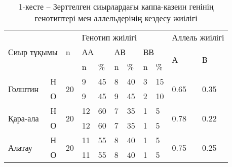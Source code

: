\begin{table}[H]
\centering
  \caption*{1-кесте – Зерттелген сиырлардағы каппа-казеин генінің генотиптері мен аллельдерінің 
  кездесу жиілігі}
  \begin{tabular}{|ll|l|llllll|ll|}
  \hline
  \multicolumn{2}{|l|}{\multirow{3}{*}{Сиыр тұқымы}} &
    \multirow{3}{*}{n} &
    \multicolumn{6}{l|}{Генотип жиілігі} &
    \multicolumn{2}{l|}{Аллель   жиілігі} \\ \cline{4-11} 
  \multicolumn{2}{|l|}{} &
     &
    \multicolumn{2}{l|}{АА} &
    \multicolumn{2}{l|}{АВ} &
    \multicolumn{2}{l|}{ВВ} &
    \multicolumn{1}{l|}{\multirow{2}{*}{А}} &
    \multirow{2}{*}{В} \\ \cline{4-9}
  \multicolumn{2}{|l|}{} &
     &
    \multicolumn{1}{l|}{n} &
    \multicolumn{1}{l|}{\%} &
    \multicolumn{1}{l|}{n} &
    \multicolumn{1}{l|}{\%} &
    \multicolumn{1}{l|}{n} &
    \% &
    \multicolumn{1}{l|}{} &
     \\ \hline
  \multicolumn{1}{|l|}{\multirow{2}{*}{Голштин}} &
    Н &
    \multirow{2}{*}{20} &
    \multicolumn{1}{l|}{9} &
    \multicolumn{1}{l|}{45} &
    \multicolumn{1}{l|}{8} &
    \multicolumn{1}{l|}{40} &
    \multicolumn{1}{l|}{3} &
    15 &
    \multicolumn{1}{l|}{\multirow{2}{*}{0.65}} &
    \multirow{2}{*}{0.35} \\ \cline{2-2} \cline{4-9}
  \multicolumn{1}{|l|}{} &
    О &
     &
    \multicolumn{1}{l|}{9} &
    \multicolumn{1}{l|}{45} &
    \multicolumn{1}{l|}{9} &
    \multicolumn{1}{l|}{45} &
    \multicolumn{1}{l|}{2} &
    10 &
    \multicolumn{1}{l|}{} &
     \\ \hline
  \multicolumn{1}{|l|}{\multirow{2}{*}{Қара-ала}} &
    Н &
    \multirow{2}{*}{20} &
    \multicolumn{1}{l|}{12} &
    \multicolumn{1}{l|}{60} &
    \multicolumn{1}{l|}{7} &
    \multicolumn{1}{l|}{35} &
    \multicolumn{1}{l|}{1} &
    5 &
    \multicolumn{1}{l|}{\multirow{2}{*}{0.78}} &
    \multirow{2}{*}{0.22} \\ \cline{2-2} \cline{4-9}
  \multicolumn{1}{|l|}{} &
    О &
     &
    \multicolumn{1}{l|}{12} &
    \multicolumn{1}{l|}{60} &
    \multicolumn{1}{l|}{7} &
    \multicolumn{1}{l|}{35} &
    \multicolumn{1}{l|}{1} &
    5 &
    \multicolumn{1}{l|}{} &
     \\ \hline
  \multicolumn{1}{|l|}{\multirow{2}{*}{Алатау}} &
    Н &
    \multirow{2}{*}{20} &
    \multicolumn{1}{l|}{11} &
    \multicolumn{1}{l|}{55} &
    \multicolumn{1}{l|}{8} &
    \multicolumn{1}{l|}{40} &
    \multicolumn{1}{l|}{1} &
    5 &
    \multicolumn{1}{l|}{\multirow{2}{*}{0.75}} &
    \multirow{2}{*}{0.25} \\ \cline{2-2} \cline{4-9}
  \multicolumn{1}{|l|}{} &
    О &
     &
    \multicolumn{1}{l|}{11} &
    \multicolumn{1}{l|}{55} &
    \multicolumn{1}{l|}{8} &
    \multicolumn{1}{l|}{40} &
    \multicolumn{1}{l|}{1} &
    5 &
    \multicolumn{1}{l|}{} &
     \\ \hline
\end{tabular}%
\end{table}

